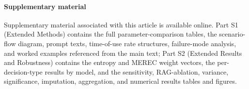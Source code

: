 \documentclass[final,3p,times]{elsarticle}
\begin{document}
\paragraph*{Supplementary material}
Supplementary material associated with this article is available online. Part S1 (Extended Methods) contains the full parameter-comparison tables, the scenario-flow diagram, prompt texts, time-of-use rate structures, failure-mode analysis, and worked examples referenced from the main text; Part S2 (Extended Results and Robustness) contains the entropy and MEREC weight vectors, the per-decision-type results by model, and the sensitivity, RAG-ablation, variance, significance, imputation, aggregation, and numerical results tables and figures.



\end{document}
